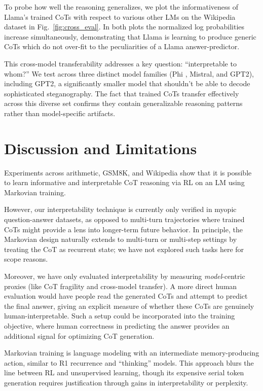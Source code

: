 \documentclass[letterpaper]{article} %
\begin{document}
To probe how well the reasoning generalizes, we plot the informativeness of Llama's trained CoTs with respect to various other LMs on the Wikipedia dataset in Fig.~\ref{fig:cross_eval}. In both plots the normalized log probabilities increase simultaneously, demonstrating that Llama is learning to produce generic CoTs which do not over-fit to the peculiarities of a Llama answer-predictor. 

This cross-model transferability addresses a key question: ``interpretable to whom?'' We test across three distinct model families (Phi \citep{abdin2024phi3technicalreporthighly}, Mistral, and GPT2), including GPT2, a significantly smaller model that shouldn't be able to decode sophisticated steganography. The fact that trained CoTs transfer effectively across this diverse set confirms they contain generalizable reasoning patterns rather than model-specific artifacts.

\section{Discussion and Limitations}
\label{sec:disc}

Experiments across arithmetic, GSM8K, and Wikipedia show that it is possible to learn informative and interpretable CoT reasoning via RL on an LM using Markovian training.

However, our interpretability technique is currently only verified in myopic question-answer datasets, as opposed to multi-turn trajectories where trained CoTs might provide a lens into longer-term future behavior. In principle, the Markovian design naturally extends to multi-turn or multi-step settings by treating the CoT as recurrent state; we have not explored such tasks here for scope reasons.

Moreover, we have only evaluated interpretability by measuring \emph{model}-centric proxies (like CoT fragility and cross-model transfer). A more direct human evaluation would have people read the generated CoTs and attempt to predict the final answer, giving an explicit measure of whether these CoTs are genuinely human-interpretable. Such a setup could be incorporated into the training objective, where human correctness in predicting the answer provides an additional signal for optimizing CoT generation.

Markovian training is language modeling with an intermediate memory-producing action, similar to R1 recurrence and ``thinking'' models. This approach blurs the line between RL and unsupervised learning, though its expensive serial token generation requires justification through gains in interpretability or perplexity.
\end{document}
